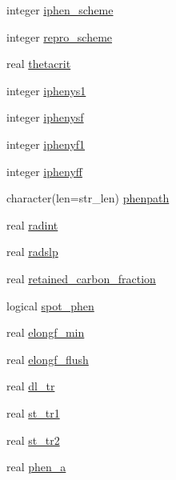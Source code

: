 \begin{DoxyCompactItemize}
\item 
integer \hyperlink{namespacephenology__coms_a2ca32a4c957a13b3cda3244a0e726b9d}{iphen\+\_\+scheme}
\item 
integer \hyperlink{namespacephenology__coms_a1dcc0357eda3944d616e4ad9fab478c3}{repro\+\_\+scheme}
\item 
real \hyperlink{namespacephenology__coms_ac20b1ab903494138d73ddf0f1f0f4199}{thetacrit}
\item 
integer \hyperlink{namespacephenology__coms_aba2182caf031b818a58393da9d560986}{iphenys1}
\item 
integer \hyperlink{namespacephenology__coms_aaa5096d4b301c2ff2aee8ab606a666aa}{iphenysf}
\item 
integer \hyperlink{namespacephenology__coms_a623dc6984b539a7d43116e4ff97a19d3}{iphenyf1}
\item 
integer \hyperlink{namespacephenology__coms_a3cc397a234dd51493f3055e0e257737f}{iphenyff}
\item 
character(len=str\+\_\+len) \hyperlink{namespacephenology__coms_a533c334911241cc02bef0ae05f5e1adc}{phenpath}
\item 
real \hyperlink{namespacephenology__coms_aa7a0cd40eeb581ef9fd19cb3d4307482}{radint}
\item 
real \hyperlink{namespacephenology__coms_a90c70299bd2648e86392527bef4e132b}{radslp}
\item 
real \hyperlink{namespacephenology__coms_acc1fb86c65678f27282e7b01f99de998}{retained\+\_\+carbon\+\_\+fraction}
\item 
logical \hyperlink{namespacephenology__coms_ab745230c697d6ab4ef13d73bd14ae10c}{spot\+\_\+phen}
\item 
real \hyperlink{namespacephenology__coms_adc8fcd1ff7a762be61c01194ccfb81df}{elongf\+\_\+min}
\item 
real \hyperlink{namespacephenology__coms_adc22aefd17157caf3c2402946b4b135b}{elongf\+\_\+flush}
\item 
real \hyperlink{namespacephenology__coms_ac1225f64f8baed73ba5216809bc4d867}{dl\+\_\+tr}
\item 
real \hyperlink{namespacephenology__coms_a5c001b38efaaf1a409368ebdef81ff3f}{st\+\_\+tr1}
\item 
real \hyperlink{namespacephenology__coms_a0f83a1b2d886e1d4979eece0617b48bd}{st\+\_\+tr2}
\item 
real \hyperlink{namespacephenology__coms_a68b65a488b28872a9aca9fed46ba4eaf}{phen\+\_\+a}
\item 

\end{DoxyCompactItemize}
